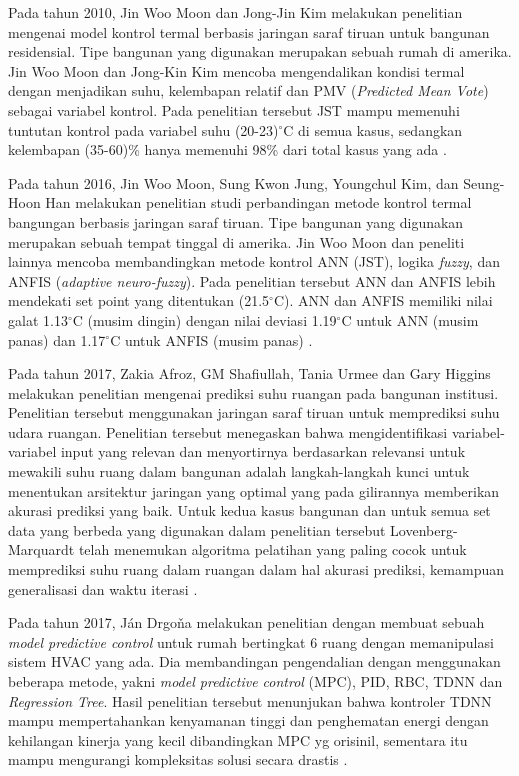 Pada tahun 2010, Jin Woo Moon dan Jong-Jin Kim melakukan penelitian mengenai model kontrol termal berbasis jaringan saraf tiruan untuk bangunan residensial. Tipe bangunan yang digunakan merupakan sebuah rumah di amerika. Jin Woo Moon dan Jong-Kin Kim mencoba mengendalikan kondisi termal dengan menjadikan suhu, kelembapan relatif dan PMV (\textit{Predicted Mean Vote}) sebagai variabel kontrol. Pada penelitian tersebut JST mampu memenuhi tuntutan kontrol pada variabel suhu (20-23)$^\circ$C di semua kasus, sedangkan kelembapan (35-60)\% hanya memenuhi 98\% dari total kasus yang ada \cite{article12}.

Pada tahun 2016, Jin Woo Moon, Sung Kwon Jung, Youngchul Kim, dan Seung-Hoon Han melakukan penelitian studi perbandingan metode kontrol termal bangungan berbasis jaringan saraf tiruan. Tipe bangunan yang digunakan merupakan sebuah tempat tinggal di amerika. Jin Woo Moon dan peneliti lainnya mencoba membandingkan metode kontrol ANN (JST), logika \textit{fuzzy}, dan ANFIS (\textit{adaptive neuro-fuzzy}). Pada penelitian tersebut ANN dan ANFIS lebih mendekati set point yang ditentukan (21.5$^{\circ}$C). ANN dan ANFIS memiliki nilai galat 1.13$^{\circ}$C (musim dingin) dengan nilai deviasi 1.19$^{\circ}$C untuk ANN (musim panas) dan 1.17$^{\circ}$C untuk ANFIS (musim panas) \cite{article13}.

Pada tahun 2017, Zakia Afroz, GM Shafiullah, Tania Urmee dan Gary Higgins melakukan penelitian mengenai prediksi suhu ruangan pada bangunan institusi. Penelitian tersebut menggunakan jaringan saraf tiruan untuk memprediksi suhu udara ruangan. Penelitian tersebut menegaskan bahwa mengidentifikasi variabel-variabel input yang relevan dan menyortirnya berdasarkan relevansi untuk mewakili suhu ruang dalam bangunan adalah langkah-langkah kunci untuk menentukan arsitektur jaringan yang optimal yang pada gilirannya memberikan akurasi prediksi yang baik. Untuk kedua kasus bangunan dan untuk semua set data yang berbeda yang digunakan dalam penelitian tersebut Lovenberg-Marquardt telah menemukan algoritma pelatihan yang paling cocok untuk memprediksi suhu ruang dalam ruangan dalam hal akurasi prediksi, kemampuan generalisasi dan waktu iterasi \cite{article14}.

Pada tahun 2017, Ján Drgoňa melakukan penelitian dengan membuat sebuah \textit{model predictive control} untuk rumah bertingkat 6 ruang dengan memanipulasi sistem HVAC yang ada. Dia membandingan pengendalian dengan menggunakan beberapa metode, yakni \textit{model predictive control} (MPC), PID, RBC, TDNN dan \textit{Regression Tree}. Hasil penelitian tersebut menunjukan bahwa kontroler TDNN mampu mempertahankan kenyamanan tinggi dan penghematan energi dengan kehilangan kinerja yang kecil dibandingkan MPC yg orisinil, sementara itu mampu mengurangi kompleksitas solusi secara drastis \cite{article15}.

